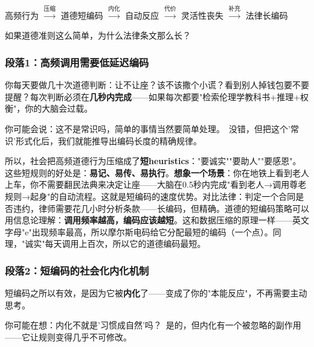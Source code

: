 \documentclass[../main.tex]{subfiles}
\begin{document}
	\begin{logicmap}

		高频行为 $\xrightarrow{\text{压缩}}$ 道德短编码 $\xrightarrow{\text{内化}}$ 自动反应 $\xrightarrow{\text{代价}}$ 灵活性丧失 $\xrightarrow{\text{补充}}$ 法律长编码

	\end{logicmap}

	\begin{questionbox}

		如果道德准则这么简单，为什么法律条文那么长？

	\end{questionbox}

	\subsubsection*{段落1：高频调用需要低延迟编码}

	你每天要做几十次道德判断：让不让座？该不该撒个小谎？看到别人掉钱包要不要提醒？每次判断必须在\textbf{几秒内完成}——如果每次都要"检索伦理学教科书+推理+权衡"，你的大脑会过载。

	\begin{tcolorbox}[colback=yellow!5, title=\textit{读者行为预测}]

		你可能会说：这不是常识吗，简单的事情当然要简单处理。\ 没错，但把这个'常识'形式化后，我们就能推导出编码长度的精确规律。

	\end{tcolorbox}

所以，社会把高频道德行为压缩成了\textbf{短heuristics}："要诚实""要助人""要感恩"。这些短规则的好处是：\textbf{易记、易传、易执行}。\textbf{想象一个场景}：你在地铁上看到老人上车，你不需要翻民法典来决定让座——大脑在0.5秒内完成"看到老人→调用尊老规则→起身"的自动流程。这就是短编码的速度优势。对比法律：判定一个合同是否违约，律师需要花几小时分析条款——长编码，但精确。道德的短编码策略可以用信息论理解：\textbf{调用频率越高，编码应该越短}。这和数据压缩的原理一样——英文字母"e"出现频率最高，所以摩尔斯电码给它分配最短的编码（一个点）。同理，"诚实"每天调用上百次，所以它的道德编码最短。

	\subsubsection*{段落2：短编码的社会化内化机制}

	短编码之所以有效，是因为它被\textbf{内化}了——变成了你的"本能反应"，不再需要主动思考。

	\begin{tcolorbox}[colback=yellow!5, title=\textit{读者行为预测}]

		你可能在想：内化不就是'习惯成自然'吗？\ 是的，但内化有一个被忽略的副作用——它让规则变得几乎不可修改。

	\end{tcolorbox}
\end{document}
